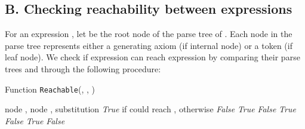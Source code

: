 \documentclass{article}
\begin{document}
\subsection*{B. Checking reachability between expressions}
\label{app:reach}
For an expression , 
let  be the root node of the parse tree of . Each node in the parse tree represents either a generating axiom (if internal node) or a token (if leaf node). 
We check if expression  can reach expression  by comparing their parse trees 
and  through the following procedure:
\begin{algorithm}[t]
   \caption{Function \texttt{Reachable}(, , )}
   \label{algo:reach}
   \begin{algorithmic}
     node , node , substitution  
     \emph{True} if  could reach , otherwise \emph{False}
            \IF{}
                 \emph{True} 
            \ELSE 
                 \emph{False} 
            \ENDIF
        \ELSE
            \STATE  {}
             \emph{True}
        \ENDIF
    \ELSE
                \STATE{}
                    \STATE{}
                     \emph{False} 
                \ENDIF
            \ENDFOR
            \STATE{}
             \emph{True} 
        \ELSE
             \emph{False} 
        \ENDIF
    \ENDIF
   \end{algorithmic}
   
\end{algorithm}
\end{document}
